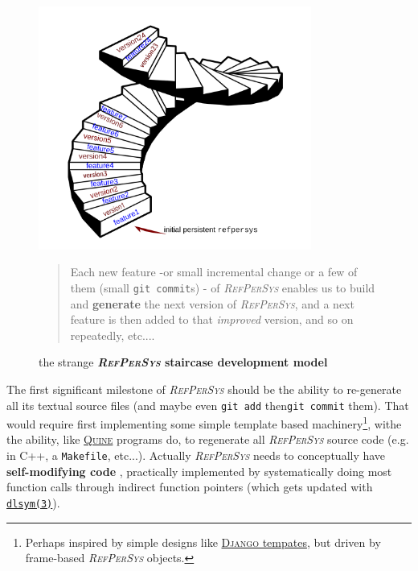 \documentclass[11pt,a4paper,svgnames]{article}
\newcommand{\RefPerSys}{{\textit{\textsc{RefPerSys}}}}
\begin{document}
\begin{figure}[h]
  \begin{center}
    \includegraphics[width=0.8\textwidth]{spiral-stairs}
  \end{center}

  \begin{quote}
    \begin{relsize}{-0.2}
    Each new feature -or small incremental change or a few of them
    (small \texttt{git commit}s) - of {\RefPerSys} enables us to build
    and \textbf{generate} the next version of {\RefPerSys}, and a next
    feature is then added to that \textit{improved} version, and so on
    repeatedly, etc....
    \end{relsize}
  \end{quote}
  
  \caption{the strange \textbf{{\RefPerSys} staircase development model} {}}
  \label{fig:bootstrap-stair}
\end{figure}

The first significant milestone of {\RefPerSys} should be the ability
to re-generate all its textual source files (and maybe even
\texttt{git add} then\texttt{git commit} them). That would require
first implementing some simple template based
machinery\footnote{Perhaps inspired by simple designs like
  \href{https://docs.djangoproject.com/en/2.2/topics/templates/}{\textsc{Django}
    tempates}, but driven by frame-based {\RefPerSys} objects.}, withe
the ability, like
\href{https://en.wikipedia.org/wiki/Quine\_(computing)}{\textsc{Quine}}
programs do, to regenerate all {\RefPerSys} source code (e.g. in C++,
a \texttt{Makefile}, etc...). Actually {\RefPerSys} needs to
conceptually have \textbf{self-modifying code}
\cite{Tschudin:2005:HarnessingSC}, practically implemented by
systematically doing most function calls through indirect function
pointers (which gets updated with
\href{http://man7.org/linux/man-pages/man3/dlsym.3.html}{\texttt{dlsym(3)}}).
\end{document}
